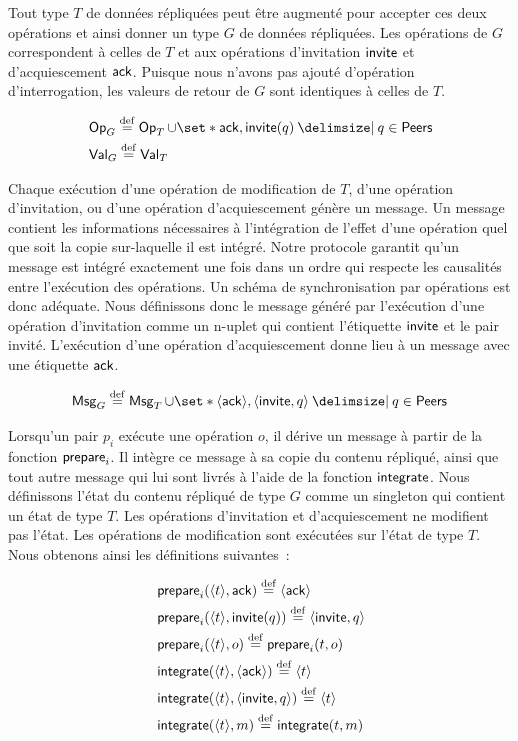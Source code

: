 Tout type $T$ de données répliquées peut être augmenté pour accepter ces deux opérations et ainsi donner un type $G$ de données répliquées.
Les opérations de $G$ correspondent à celles de $T$ et aux opérations d'invitation $\operatorname{\mathsf{invite}}$ et d'acquiescement $\operatorname{\mathsf{ack}}$.
Puisque nous n'avons pas ajouté d'opération d'interrogation, les valeurs de retour de $G$ sont identiques à celles de $T$.

\begin{align*}
    &\trm{Op}_G \defeq \trm{Op}_T \cup \set*{\trm{ack}, \trm{invite}(q) \given q \in \trm{Peers}}\\
    &\trm{Val}_G \defeq \trm{Val}_T
\end{align*}

Chaque exécution d'une opération de modification de $T$, d'une opération d'invitation, ou d'une opération d'acquiescement génère un message.
Un message contient les informations nécessaires à l'intégration de l'effet d'une opération quel que soit la copie sur-laquelle il est intégré.
Notre protocole garantit qu'un message est intégré exactement une fois dans un ordre qui respecte les causalités entre l'exécution des opérations.
Un schéma de synchronisation par opérations est donc adéquate.
Nous définissons donc le message généré par l'exécution d'une opération d'invitation comme un n-uplet qui contient l'étiquette $\operatorname{\mathsf{invite}}$ et le pair invité.
L'exécution d'une opération d'acquiescement donne lieu à un message avec une étiquette $\operatorname{\mathsf{ack}}$.

\begin{equation*}
    \trm{Msg}_G \defeq \trm{Msg}_T \cup \set*{\tuple*{\trm{ack}}, \tuple*{\trm{invite}, q} \given q \in \trm{Peers}}
\end{equation*}

Lorsqu'un pair $p_i$ exécute une opération $o$, il dérive un message à partir de la fonction $\operatorname{\mathsf{prepare}}_i$.
Il intègre ce message à sa copie du contenu répliqué, ainsi que tout autre message qui lui sont livrés à l'aide de la fonction $\operatorname{\mathsf{integrate}}$.
Nous définissons l'état du contenu répliqué de type $G$ comme un singleton qui contient un état de type $T$.
Les opérations d'invitation et d'acquiescement ne modifient pas l'état.
Les opérations de modification sont exécutées sur l'état de type $T$.
Nous obtenons ainsi les définitions suivantes~:

\begin{align*}
    &\trm{prepare}_i(\tuple*{t}, \trm{ack}) \defeq \tuple*{\trm{ack}}\\
    &\trm{prepare}_i(\tuple*{t}, \trm{invite}(q)) \defeq \tuple*{\trm{invite}, q}\\
    &\trm{prepare}_i(\tuple*{t}, o) \defeq \trm{prepare}_i(t, o)\\
    &\trm{integrate}(\tuple*{t}, \tuple*{\trm{ack}}) \defeq \tuple*{t}\\
    &\trm{integrate}(\tuple*{t}, \tuple*{\trm{invite}, q}) \defeq \tuple*{t}\\
    &\trm{integrate}(\tuple*{t}, m) \defeq \trm{integrate}(t, m)
\end{align*}

